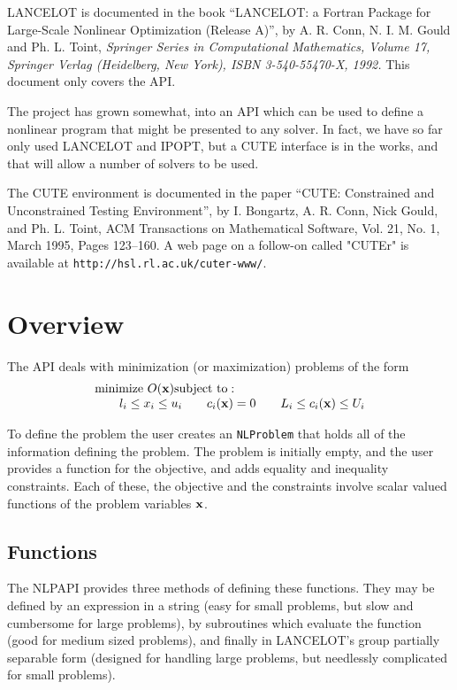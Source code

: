 \documentclass[12pt]{article}
\begin{document}
    LANCELOT is documented in the book ``LANCELOT: a Fortran Package for
    Large-Scale Nonlinear Optimization (Release A)'', by A. R. Conn, 
    N. I. M. Gould and Ph. L. Toint, {\it Springer Series in Computational 
    Mathematics, Volume 17, Springer Verlag (Heidelberg, New York), 
    ISBN 3-540-55470-X, 1992.} This document only covers the API.

    The project has grown somewhat, into an API which can be used to define a
    nonlinear program that might be presented to any solver.
    In fact, we have so far only used LANCELOT and IPOPT, but a CUTE interface
    is in the works, and that will allow a number of solvers to be used.

    The CUTE environment is documented in the paper ``CUTE: Constrained and Unconstrained
    Testing Environment'', by I. Bongartz, A. R. Conn, Nick Gould, and Ph. L. Toint,
    ACM Transactions on Mathematical Software, Vol. 21, No. 1, March 1995, Pages 123--160.
    A web page on a follow-on called "CUTEr" is available at {\tt http://hsl.rl.ac.uk/cuter-www/}.

   \section{Overview}

   The API deals with minimization (or maximization) problems of the form
   \begin{displaymath}
     \begin{array}{l}
      {\rm minimize}~O({\bf x})
      {\rm subject~to:}\\
      \qquad l_i \leq x_i \leq u_i
      \qquad c_i({\bf x}) = 0
      \qquad L_i \leq c_i({\bf x}) \leq U_i
     \end{array}
   \end{displaymath}

     To define the problem the user creates an {\tt NLProblem} that
    holds all of the information defining the problem. The problem is initially
    empty, and the user provides a function for the objective,
    and adds equality and inequality constraints. Each of these, the objective and the
    constraints involve scalar valued functions of the problem variables ${\bf x}$.

   \subsection{Functions}

    The NLPAPI provides three methods of defining these functions. They may be defined by an expression 
    in a string (easy for small problems, but slow and cumbersome for large problems), by subroutines
    which evaluate the function (good for medium sized problems), and finally in LANCELOT's group partially
    separable form (designed for handling large problems, but needlessly complicated for small problems).
\end{document}
